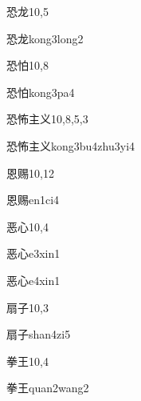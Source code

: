 \begin{entry}{恐龙}{10,5}
  \begin{phonetics}{恐龙}{kong3long2}
  \end{phonetics}
\end{entry}

\begin{entry}{恐怕}{10,8}
  \begin{phonetics}{恐怕}{kong3pa4}
  \end{phonetics}
\end{entry}

\begin{entry}{恐怖主义}{10,8,5,3}
  \begin{phonetics}{恐怖主义}{kong3bu4zhu3yi4}
  \end{phonetics}
\end{entry}

\begin{entry}{恩赐}{10,12}
  \begin{phonetics}{恩赐}{en1ci4}
  \end{phonetics}
\end{entry}

\begin{entry}{恶心}{10,4}
  \begin{phonetics}{恶心}{e3xin1}
  \end{phonetics}
  \begin{phonetics}{恶心}{e4xin1}
  \end{phonetics}
\end{entry}

\begin{entry}{扇子}{10,3}
  \begin{phonetics}{扇子}{shan4zi5}
  \end{phonetics}
\end{entry}

\begin{entry}{拳王}{10,4}
  \begin{phonetics}{拳王}{quan2wang2}
  \end{phonetics}
\end{entry}

